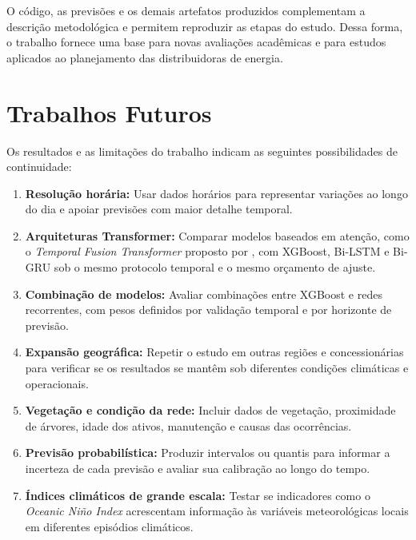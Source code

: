 O código, as previsões e os demais artefatos produzidos complementam a descrição metodológica e permitem reproduzir as etapas do estudo. Dessa forma, o trabalho fornece uma base para novas avaliações acadêmicas e para estudos aplicados ao planejamento das distribuidoras de energia.

\section{Trabalhos Futuros}\label{sec:futuros}

Os resultados e as limitações do trabalho indicam as seguintes possibilidades de continuidade:

\begin{enumerate}
    \item \textbf{Resolução horária:} Usar dados horários para representar variações ao longo do dia e apoiar previsões com maior detalhe temporal.

    \item \textbf{Arquiteturas Transformer:} Comparar modelos baseados em atenção, como o \textit{Temporal Fusion Transformer} proposto por \cite{lim2021temporal}, com XGBoost, Bi-LSTM e Bi-GRU sob o mesmo protocolo temporal e o mesmo orçamento de ajuste.

    \item \textbf{Combinação de modelos:} Avaliar combinações entre XGBoost e redes recorrentes, com pesos definidos por validação temporal e por horizonte de previsão.

    \item \textbf{Expansão geográfica:} Repetir o estudo em outras regiões e concessionárias para verificar se os resultados se mantêm sob diferentes condições climáticas e operacionais.

    \item \textbf{Vegetação e condição da rede:} Incluir dados de vegetação, proximidade de árvores, idade dos ativos, manutenção e causas das ocorrências.

    \item \textbf{Previsão probabilística:} Produzir intervalos ou quantis para informar a incerteza de cada previsão e avaliar sua calibração ao longo do tempo.

    \item \textbf{Índices climáticos de grande escala:} Testar se indicadores como o \textit{Oceanic Niño Index} acrescentam informação às variáveis meteorológicas locais em diferentes episódios climáticos.


\end{enumerate}
